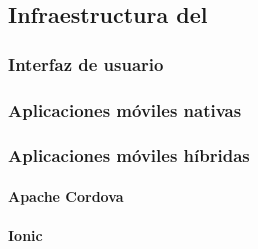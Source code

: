 \subsection{Infraestructura del }
\label{interfaz_usuario}

\subsubsection{Interfaz de usuario}
\label{interfaz_usuario}

\subsubsection{Aplicaciones móviles nativas}
\label{apps_nativas}

\subsubsection{Aplicaciones móviles híbridas}
\label{apps_hibirdas}

\paragraph{Apache Cordova}
\label{cordova}

\paragraph{Ionic}
\label{ionic}